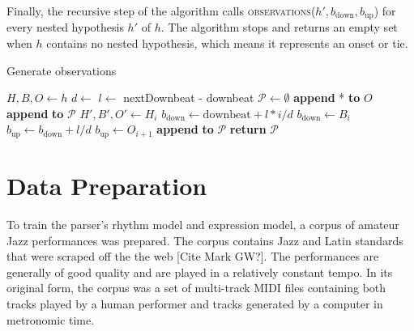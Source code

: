 Finally, the recursive step of the algorithm calls \textsc{observations}($h', b_{\mathrm{down}}, b_{\mathrm{up}}$) for every nested hypothesis $h'$ of $h$. The algorithm stops and returns an empty set when $h$ contains no nested hypothesis, which means it represents an onset or tie.


\begin{algorithm}
\caption{Generate observations}
\label{alg:observations}
\begin{algorithmic}
	\State $H, B, O \leftarrow h$
	\State $d \leftarrow$ 
	\State $l \leftarrow$ nextDownbeat - downbeat
	\State $\mathcal{P} \leftarrow \emptyset$
	\State \textbf{append} * \textbf{to} $O$
			\State \textbf{append}  \textbf{to} $\mathcal{P}$
		\EndIf	
		\State $H', B', O' \leftarrow H_i$
			\State $b_{\mathrm{down}} \leftarrow \mathrm{downbeat} + l * i/d$
				\State $b_{\mathrm{down}} \leftarrow B_i$
			\EndIf
			\State $b_{\mathrm{up}} \leftarrow b_{\mathrm{down}} + l/d$
				\State $b_{\mathrm{up}} \leftarrow O_{i+1}$
			\EndIf
			\State \textbf{append}  \textbf{to} $\mathcal{P}$
		\EndIf
	\EndFor
	\State \textbf{return} $\mathcal{P}$
\EndFunction
\end{algorithmic}
\end{algorithm}








\section{Data Preparation}
\label{sec:corpus}

To train the parser's rhythm model and expression model, a corpus of amateur Jazz performances was prepared. The corpus contains Jazz and Latin standards that were scraped off the the web [Cite Mark GW?]. The performances are generally of good quality and are played in a relatively constant tempo. In its original form, the corpus was a set of multi-track MIDI files containing both tracks played by a human performer and tracks generated by a computer in metronomic time.

